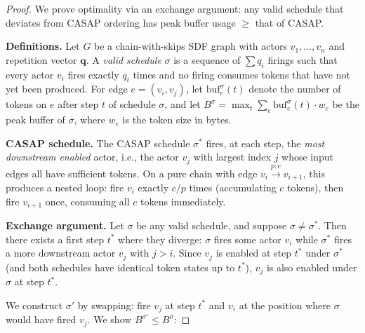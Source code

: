 \documentclass[journal]{IEEEtran}
\begin{document}
\begin{proof}
We prove optimality via an exchange argument: any valid schedule that deviates from CASAP ordering has peak buffer usage $\geq$ that of CASAP.

\textbf{Definitions.}
Let $G$ be a chain-with-skips SDF graph with actors $v_1, \ldots, v_n$ and repetition vector $\mathbf{q}$.
A \emph{valid schedule} $\sigma$ is a sequence of $\sum q_i$ firings such that every actor $v_i$ fires exactly $q_i$ times and no firing consumes tokens that have not yet been produced.
For edge $e = (v_i, v_j)$, let $\mathrm{buf}_e^{\sigma}(t)$ denote the number of tokens on $e$ after step $t$ of schedule $\sigma$, and let $B^{\sigma} = \max_t \sum_e \mathrm{buf}_e^{\sigma}(t) \cdot w_e$ be the peak buffer of $\sigma$, where $w_e$ is the token size in bytes.

\textbf{CASAP schedule.}
The CASAP schedule $\sigma^*$ fires, at each step, the \emph{most downstream enabled} actor, i.e., the actor $v_j$ with largest index $j$ whose input edges all have sufficient tokens.
On a pure chain with edge $v_i \xrightarrow{p:c} v_{i+1}$, this produces a nested loop: fire $v_i$ exactly $c/p$ times (accumulating $c$ tokens), then fire $v_{i+1}$ once, consuming all $c$ tokens immediately.

\textbf{Exchange argument.}
Let $\sigma$ be any valid schedule, and suppose $\sigma \neq \sigma^*$.
Then there exists a first step $t^*$ where they diverge: $\sigma$ fires some actor $v_i$ while $\sigma^*$ fires a more downstream actor $v_j$ with $j > i$.
Since $v_j$ is enabled at step $t^*$ under $\sigma^*$ (and both schedules have identical token states up to $t^*$), $v_j$ is also enabled under $\sigma$ at step $t^*$.

We construct $\sigma'$ by swapping: fire $v_j$ at step $t^*$ and $v_i$ at the position where $\sigma$ would have fired $v_j$. We show $B^{\sigma'} \leq B^{\sigma}$:


\end{proof}
\end{document}
